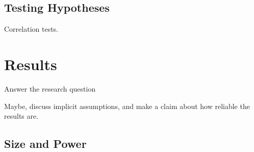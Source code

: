\documentclass[11pt, oneside]{article}
\begin{document}
\subsection{Testing Hypotheses}

Correlation tests. 


\section{Results}


Answer the research question 

Maybe, discuss implicit assumptions, and make a claim about how reliable the results are. 

\subsection{Size and Power}
\end{document}
